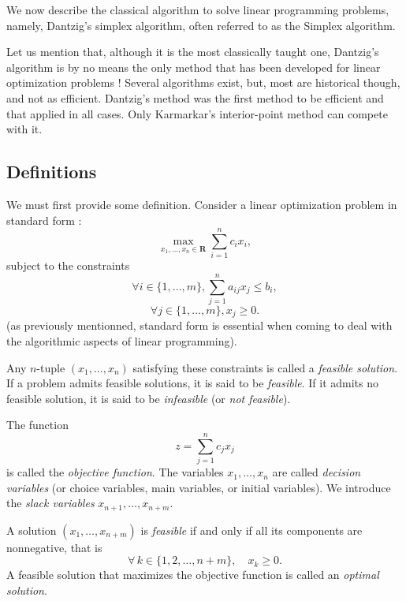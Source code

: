 We now describe the classical algorithm to solve linear programming problems, namely, Dantzig's simplex algorithm, often referred to as the Simplex algorithm.

Let us mention that, although it is the most classically taught one, Dantzig's algorithm is by no means the only method that has been developed for linear optimization problems ! Several algorithms exist, but, most are historical though, and not as efficient. Dantzig's method was the first method to be efficient and that applied in all cases. Only Karmarkar's interior-point method \cite{karmarkar1984} can compete with it.

\subsection{Definitions}

We must first provide some definition. Consider a linear optimization problem in standard form : 
\[
    \max_{x_1, ..., x_n \in \mathbf R}\sum_{i=1}^n c_i x_i,
\]
subject to the constraints
\[
    \forall i \in \{ 1, ..., m \}, \sum_{j=1}^n a_{ij} x_j \leqslant b_i,
\]
\[
    \forall j \in \{ 1, ..., m \}, x_j \geqslant 0.
\]
(as previously mentionned, standard form is essential when coming to deal with the algorithmic aspects of linear programming).

\begin{definition}
    Any $n$-tuple $(x_1,\dots,x_n)$ satisfying these constraints is called a \emph{feasible solution}.
    If a problem admits feasible solutions, it is said to be \emph{feasible}.
    If it admits no feasible solution, it is said to be \emph{infeasible} (or \emph{not feasible}).
\end{definition}

\begin{definition}
    The function
    \[
    z = \sum_{j=1}^n c_j x_j
    \]
    is called the \emph{objective function}.
    The variables $x_1,\dots,x_n$ are called \emph{decision variables} (or choice variables, main variables, or initial variables).
    We introduce the \emph{slack variables} $x_{n+1},\dots,x_{n+m}$.
\end{definition}

\begin{remark}
A solution $(x_1,\dots,x_{n+m})$ is \emph{feasible} if and only if all its components are nonnegative, that is
\[
   \forall\,k\in\{1,2,\dots,n+m\},\quad x_k \ge 0 .
\]
A feasible solution that maximizes the objective function is called an \emph{optimal solution}.
\end{remark}

